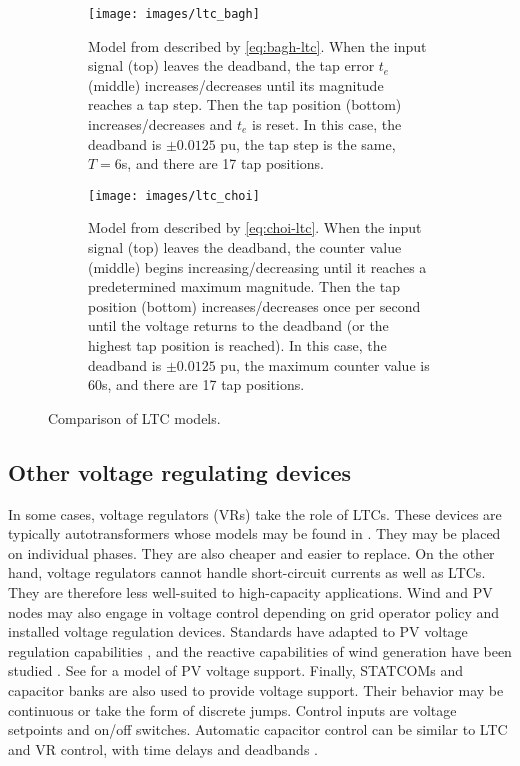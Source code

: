 \documentclass[10pt,letterpaper]{article}
\begin{document}
\begin{figure}[h!]
	\centering
	\begin{subfigure}[t]{0.47\textwidth}
		\centering
		\texttt{[image: images/ltc\_bagh]}
		\caption{Model from \cite{baghsorkhi2015} described by \eqref{eq:bagh-ltc}. When the input signal (top) leaves the deadband, the tap error $t_e$ (middle) increases/decreases until its magnitude reaches a tap step. Then the tap position (bottom) increases/decreases and $t_e$ is reset. In this case, the deadband is $\pm 0.0125$ pu, the tap step is the same, $T=6$s, and there are 17 tap positions.}
		\label{fig:ltc_bagh}
	\end{subfigure}	\quad
	\begin{subfigure}[t]{0.47\textwidth}
		\texttt{[image: images/ltc\_choi]}
		\caption{Model from \cite{choi2009} described by \eqref{eq:choi-ltc}. When the input signal (top) leaves the deadband, the counter value (middle) begins increasing/decreasing until it reaches a predetermined maximum magnitude. Then the tap position (bottom) increases/decreases once per second until the voltage returns to the deadband (or the highest tap position is reached). In this case, the deadband is $\pm 0.0125$ pu, the maximum counter value is 60s, and there are 17 tap positions.}
		\label{fig:ltc_choi}
	\end{subfigure}
	\caption{Comparison of LTC models.}
\end{figure}

\subsection{Other voltage regulating devices}
In some cases, voltage regulators (VRs) take the role of LTCs. These devices are typically autotransformers \cite{agalgaonkar2014} whose models may be found in \cite{kersting2012,garcia2001}. They may be placed on individual phases. They are also cheaper and easier to replace. On the other hand, voltage regulators cannot handle short-circuit currents as well as LTCs. They are therefore less well-suited to high-capacity applications. Wind and PV nodes may also engage in voltage control depending on grid operator policy and installed voltage regulation devices. Standards have adapted to PV voltage regulation capabilities \cite{basso2012}, and the reactive capabilities of wind generation have been studied \cite{camm2009}. See \cite{agalgaonkar2014} for a model of PV voltage support. Finally, STATCOMs and capacitor banks are also used to provide voltage support. Their behavior may be continuous or take the form of discrete jumps. Control inputs are voltage setpoints and on/off switches. Automatic capacitor control can be similar to LTC and VR control, with time delays and deadbands \cite{taylor1994}.
\end{document}
